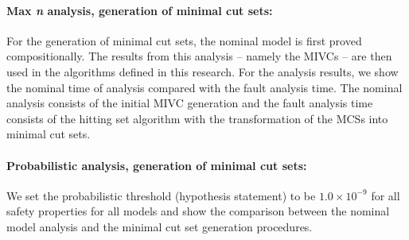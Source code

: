 
\paragraph{Max \textit{n} analysis, generation of minimal cut sets:} For the generation of minimal cut sets, the nominal model is first proved compositionally. The results from this analysis -- namely the MIVCs -- are then used in the algorithms defined in this research. For the analysis results, we show the nominal time of analysis compared with the fault analysis time. The nominal analysis consists of the initial MIVC generation and the fault analysis time consists of the hitting set algorithm with the transformation of the MCSs into minimal cut sets. 


\paragraph{Probabilistic analysis, generation of minimal cut sets:} We set the probabilistic threshold (hypothesis statement) to be $1.0 \times 10^{-9}$ for all safety properties for all models and show the comparison between the nominal model analysis and the minimal cut set generation procedures. 


